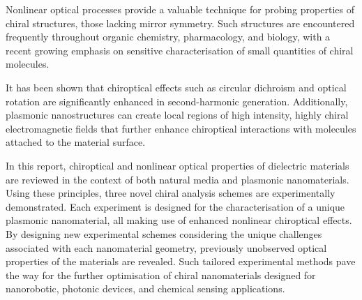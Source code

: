 Nonlinear optical processes provide a valuable technique for probing properties of chiral structures, those lacking mirror symmetry. 
Such structures are encountered frequently throughout organic chemistry, pharmacology, and biology, with a recent growing emphasis on sensitive characterisation of small quantities of chiral molecules. 
	    
It has been shown that chiroptical effects such as circular dichroism and optical rotation are significantly enhanced in second-harmonic generation. 
Additionally, plasmonic nanostructures can create local regions of high intensity, highly chiral electromagnetic fields that further enhance chiroptical interactions with molecules attached to the material surface. 
	    
In this report, chiroptical and nonlinear optical properties of dielectric materials are reviewed in the context of both natural media and plasmonic nanomaterials. 
Using these principles, three novel chiral analysis schemes are experimentally demonstrated. Each experiment is designed for the characterisation of a unique plasmonic nanomaterial, all making use of enhanced nonlinear chiroptical effects. 
By designing new experimental schemes considering the unique challenges associated with each nanomaterial geometry, previously unobserved optical properties of the materials are revealed. Such tailored experimental methods pave the way for the further optimisation of chiral nanomaterials designed for nanorobotic, photonic devices, and chemical sensing applications.